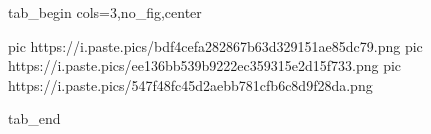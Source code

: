  
 
 
 
 


\ifcmt
  tab_begin cols=3,no_fig,center

     pic https://i.paste.pics/bdf4cefa282867b63d329151ae85dc79.png
     pic https://i.paste.pics/ee136bb539b9222ec359315e2d15f733.png
     pic https://i.paste.pics/547f48fc45d2aebb781cfb6c8d9f28da.png

  tab_end
\fi

